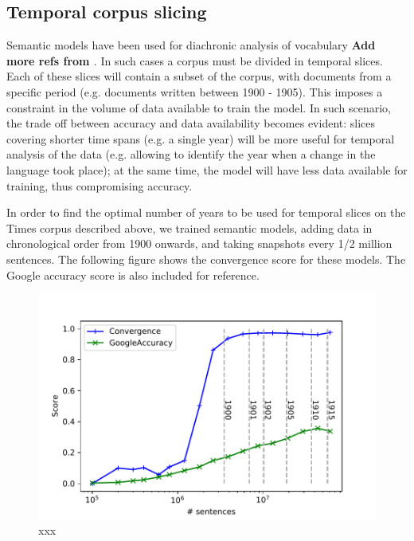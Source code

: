 \documentclass{article} %
\begin{document}
\subsection{Temporal corpus slicing}
\label{subsec:temporal_corpus_slicing}
Semantic models have been used for diachronic analysis of vocabulary \cite{Martinez_Histo2016,Hellrich_COLING2016} \textbf{Add more refs from \cite{Hellrich_COLING2016}}. In such cases a corpus must be divided in temporal slices. Each of these slices will contain a subset of the corpus, with documents from a specific period (e.g. documents written between 1900 - 1905). This imposes a constraint in the volume of data available to train the model. In such scenario, the trade off between accuracy and data availability becomes evident: slices covering shorter time spans (e.g. a single year) will be more useful for temporal analysis of the data (e.g. allowing to identify the year when a change in the language took place); at the same time, the model will have less data available for training, thus compromising accuracy.

In order to find the optimal number of years to be used for temporal slices on the Times corpus described above, we trained semantic models, adding data in chronological order from 1900 onwards, and taking snapshots every 1/2 million sentences. The following figure shows the convergence score for these models. The Google accuracy score is also included for reference.

\begin{figure}
 \includegraphics[width=\textwidth]{diachronicSlices.pdf} 
 \caption{xxx}
 \label{fig:diachronic}
\end{figure}
\end{document}

